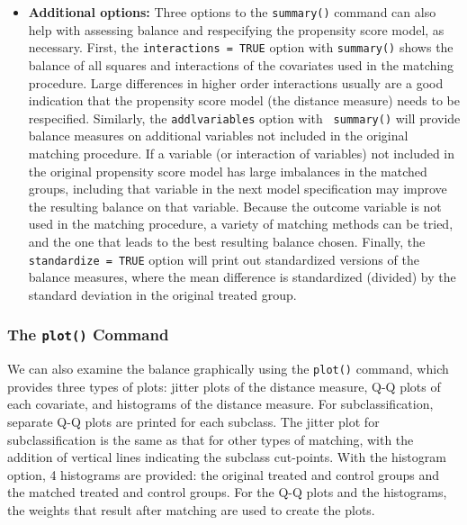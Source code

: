 \begin{itemize}
\item {\bf Additional options:} Three options to the \texttt{summary()}
  command can also help with assessing balance and respecifying the
  propensity score model, as necessary.  First, the {\tt interactions
    = TRUE} option with {\tt summary()} shows the balance of all
  squares and interactions of the covariates used in the matching
  procedure.  Large differences in higher order interactions usually
  are a good indication that the propensity score model (the distance measure) needs to be
  respecified.  Similarly, the {\tt addlvariables} option with {\tt
    summary()} will provide balance measures on additional variables
  not included in the original matching procedure.  If a variable (or
  interaction of variables) not included in the original propensity score model
  has large imbalances in the matched groups, including that
  variable in the next model specification may improve the resulting
  balance on that variable.  Because the outcome variable is not used
  in the matching procedure, a variety of matching methods can be
  tried, and the one that leads to the best resulting balance chosen.  Finally,
  the {\tt standardize = TRUE} option will print out standardized versions of the
  balance measures, where the mean difference is standardized (divided) by the standard deviation
  in the original treated group.
\end{itemize}

\subsubsection{The \texttt{plot()} Command}

We can also examine the balance graphically using the \texttt{plot()}
command, which provides three types of plots: jitter plots of the
distance measure, Q-Q plots of each covariate, and histograms of the 
distance measure.  For subclassification, separate Q-Q plots are
printed for each subclass.  The jitter plot for subclassification is
the same as that for other types of matching, with the addition of
vertical lines indicating the subclass cut-points.  With the histogram option,
4 histograms are provided: the original treated and control groups and the matched
treated and control groups.  For the Q-Q plots and the histograms, the weights that result
after matching are used to create the plots.


